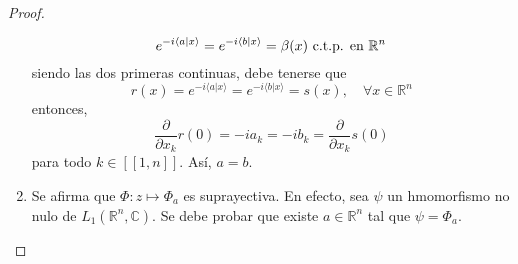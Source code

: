 \documentclass[12pt]{report}
\theoremstyle{largebreak}
\newcommand\pint[2]{\ensuremath{\langle#1| #2\rangle}}
\newcommand{\natint}[1]{\ensuremath{\left[\!\left[#1\right]\!\right]}}
\begin{document}
\begin{proof}
\begin{enumerate}
            \begin{equation*}
                e^{ -i\pint{a}{x}}=e^{ -i\pint{b}{x}}=\beta(x)\textup{ c.t.p. en }\mathbb{R}^n
            \end{equation*}
            siendo las dos primeras continuas, debe tenerse que
            \begin{equation*}
                r(x)=e^{ -i\pint{a}{x}}=e^{ -i\pint{b}{x}}=s(x),\quad\forall x\in\mathbb{R}^n
            \end{equation*}
            entonces,
            \begin{equation*}
                \frac{\partial}{\partial x_k}r(0)=-ia_k=-ib_k=\frac{\partial}{\partial x_k}s(0)
            \end{equation*}
            para todo $k\in\natint{1,n}$. Así, $a=b$.
            \item Se afirma que $\Phi:z\mapsto\Phi_a$ es suprayectiva. En efecto, sea $\psi$ un hmomorfismo no nulo de $L_1(\mathbb{R}^n,\mathbb{C})$. Se debe probar que existe $a\in\mathbb{R}^n$ tal que $\psi=\Phi_a$.
            

\end{enumerate}
\end{proof}
\end{document}
